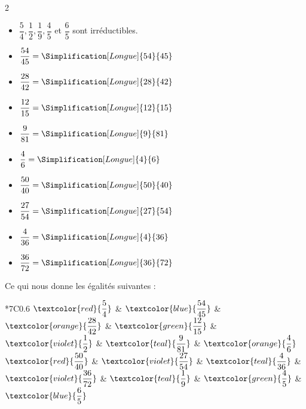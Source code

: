\begin{Maquette}[Fiche,CorrigeFin,Colonnes=2]{}
\begin{multicols}{2}
      \begin{Solution}
         \begin{itemize}
            \item $\dfrac54, \dfrac12, \dfrac19, \dfrac45$ et $\dfrac65$ sont irréductibles.
            \item $\displaystyle{\dfrac{54}{45}=\Simplification[Longue]{54}{45}}$ 
            \item $\displaystyle{\frac{28}{42}=\Simplification[Longue]{28}{42}}$
            \item $\displaystyle{\frac{12}{15}=\Simplification[Longue]{12}{15}}$
            \item $\displaystyle{\frac{9}{81}=\Simplification[Longue]{9}{81}}$
            \item $\displaystyle{\frac{4}{6}=\Simplification[Longue]{4}{6}}$
            \item $\displaystyle{\frac{50}{40}=\Simplification[Longue]{50}{40}}$
            \item $\displaystyle{\frac{27}{54}=\Simplification[Longue]{27}{54}}$
            \item $\displaystyle{\frac{4}{36}=\Simplification[Longue]{4}{36}}$
            \item $\displaystyle{\frac{36}{72}=\Simplification[Longue]{36}{72}}$
         \end{itemize}
         Ce qui nous donne les égalités suivantes : \par
         {
         \begin{tabular}[t]{*{7}{C{0.6}}}
            $\textcolor{red}{\dfrac{5}{4}}$ & $\textcolor{blue}{\dfrac{54}{45}}$ & $\textcolor{orange}{\dfrac{28}{42}}$ & $\textcolor{green}{\dfrac{12}{15}}$ & $\textcolor{violet}{\dfrac{1}{2}}$ & $\textcolor{teal}{\dfrac{9}{81}}$ & $\textcolor{orange}{\dfrac{4}{6}}$ \\
            $\textcolor{red}{\dfrac{50}{40}}$ & $\textcolor{violet}{\dfrac{27}{54}}$ & $\textcolor{teal}{\dfrac{4}{36}}$ & $\textcolor{violet}{\dfrac{36}{72}}$ & $\textcolor{teal}{\dfrac{1}{9}}$ & $\textcolor{green}{\dfrac{4}{5}}$ & $\textcolor{blue}{\dfrac{6}{5}}$ \\
         \end{tabular}}
      \end{Solution}
         


\end{multicols}
\end{Maquette}
